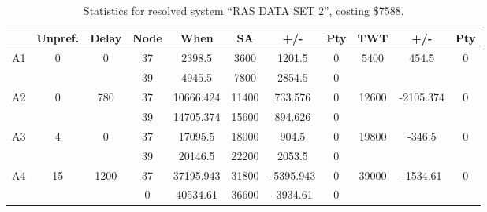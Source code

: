 \begin{sidewaystable}
\footnotesize
\caption{Statistics for resolved system ``RAS DATA SET 2'', costing \$7588.}
\centering
\begin{tabular}{c||c|c||c|c|c|c|c||c|c|c}
  \hline \hline
  &
  Unpref. & 
  Delay &
  Node &
  When &
  SA &
  +/- &
  Pty &
  TWT &
  +/- &
  Pty \\
      \hline
      \multirow{2}{*}{A1} &
      \multirow{2}{*}{0} &
      \multirow{2}{*}{0} &
      37 &
      2398.5 &
      3600 &
        1201.5 &
        0 &
      \multirow{2}{*}{5400} &
        \multirow{2}{*}{454.5} &
        \multirow{2}{*}{0}
      \\
      \cline{4-8}
       &
       &
       &
      39 &
      4945.5 &
      7800 &
        2854.5 &
        0 &
      
         &
        
      \\
      \hline
      \multirow{2}{*}{A2} &
      \multirow{2}{*}{0} &
      \multirow{2}{*}{780} &
      37 &
      10666.424 &
      11400 &
        733.576 &
        0 &
      \multirow{2}{*}{12600} &
        \multirow{2}{*}{-2105.374} &
        \multirow{2}{*}{0}
      \\
      \cline{4-8}
       &
       &
       &
      39 &
      14705.374 &
      15600 &
        894.626 &
        0 &
      
         &
        
      \\
      \hline
      \multirow{2}{*}{A3} &
      \multirow{2}{*}{4} &
      \multirow{2}{*}{0} &
      37 &
      17095.5 &
      18000 &
        904.5 &
        0 &
      \multirow{2}{*}{19800} &
        \multirow{2}{*}{-346.5} &
        \multirow{2}{*}{0}
      \\
      \cline{4-8}
       &
       &
       &
      39 &
      20146.5 &
      22200 &
        2053.5 &
        0 &
      
         &
        
      \\
      \hline
      \multirow{2}{*}{A4} &
      \multirow{2}{*}{15} &
      \multirow{2}{*}{1200} &
      37 &
      37195.943 &
      31800 &
        -5395.943 &
        0 &
      \multirow{2}{*}{39000} &
        \multirow{2}{*}{-1534.61} &
        \multirow{2}{*}{0}
      \\
      \cline{4-8}
       &
       &
       &
      0 &
      40534.61 &
      36600 &
        -3934.61 &
        0 &
      

\end{tabular}
\end{sidewaystable}
